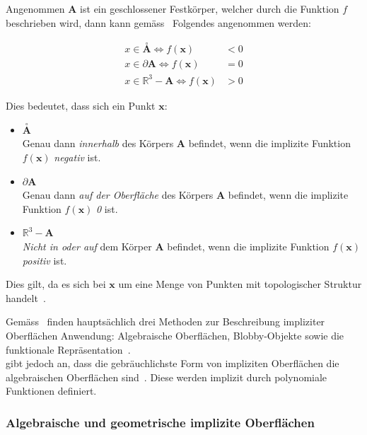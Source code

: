 Angenommen $ \bm{A} $ ist ein geschlossener Festkörper, welcher durch die
Funktion $f$ beschrieben wird, dann kann gemäss~\citeauthor{hart_ray_1993} Folgendes
angenommen werden:

\begin{align} \label{eq:surface_implicit_condition}
    x \in \overset{\circ}{\bm{A}} \Leftrightarrow f(\bm{x}) &< 0 \\
    x \in \partial \bm{A}         \Leftrightarrow f(\bm{x}) &= 0 \\
    x \in \mathbb{R}^{3} - \bm{A} \Leftrightarrow f(\bm{x}) &> 0
\end{align}

Dies bedeutet, dass sich ein Punkt $\bm{x}$:

\begin{itemize}
    \item{$\overset{\circ}{\bm{A}}$}\\
        Genau dann \textit{innerhalb} des Körpers $\bm{A}$ befindet,
        wenn die implizite Funktion $f(\bm{x})$ \textit{negativ} ist.
    \item $\partial{\bm{A}}$\\
        Genau dann \textit{auf der Oberfläche} des Körpers $\bm{A}$
        befindet, wenn die implizite Funktion $f(\bm{x})$ \textit{0}
        ist.
    \item $\mathbb{R}^{3} - \bm{A}$\\
        \textit{Nicht in oder auf} dem Körper $\bm{A}$ befindet, wenn
        die implizite Funktion $f(\bm{x})$ \textit{positiv} ist.
\end{itemize}

Dies gilt, da es sich bei $ \bm{x} $ um eine Menge von Punkten mit topologischer
Struktur handelt~\parencite[S. 1]{hart_ray_1993}.

Gemäss~\citeauthor{menon_introduction_1996} finden hauptsächlich drei
Methoden zur Beschreibung impliziter Oberflächen Anwendung: Algebraische
Oberflächen, Blobby-Objekte sowie die funktionale
Repräsentation~\parencite[S.  1]{menon_introduction_1996}.\\
\citeauthor{hart_sphere_1994} gibt jedoch an, dass die gebräuchlichste
Form von impliziten Oberflächen die algebraischen Oberflächen
sind~\parencite[S. 527]{hart_sphere_1994}. Diese werden implizit durch
polynomiale Funktionen definiert.

\subsubsection{Algebraische und geometrische implizite Oberflächen}
\label{ssubsec:implicit_surfaces_algebraic_geometric}

